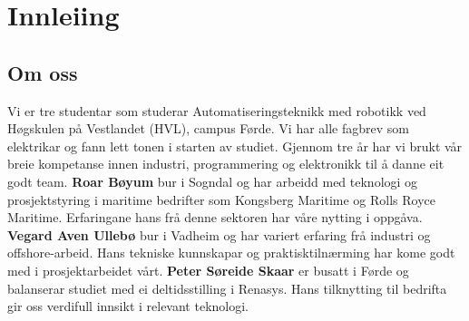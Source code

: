\chapter{Innleiing}
\thispagestyle{fancy}

\section{Om oss}
Vi er tre studentar som studerar Automatiseringsteknikk med robotikk ved Høgskulen på Vestlandet (\gls{HVL}), campus Førde.
Vi har alle fagbrev som elektrikar og fann lett tonen i starten av studiet. \newline
Gjennom tre år har vi brukt vår breie kompetanse innen industri, programmering og elektronikk
til å danne eit godt team.
\newline \newline
\textbf{Roar Bøyum} bur i Sogndal og har arbeidd med teknologi og prosjektstyring i maritime bedrifter som
Kongsberg Maritime og Rolls Royce Maritime. Erfaringane hans frå denne sektoren har våre nytting i oppgåva.
\newline \newline
\textbf{Vegard Aven Ullebø} bur i Vadheim og har variert erfaring frå industri og offshore-arbeid. 
Hans tekniske kunnskapar og praktisktilnærming har kome godt med i prosjektarbeidet vårt. 
\newline \newline
\textbf{Peter Søreide Skaar} er busatt i Førde og balanserar studiet med ei deltidsstilling i Renasys. Hans tilknytting til bedrifta
gir oss verdifull innsikt i relevant teknologi. 

\newpage


